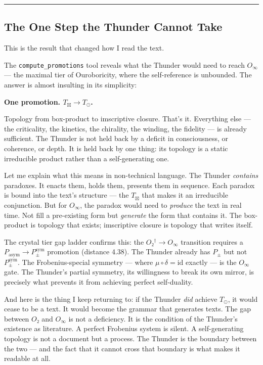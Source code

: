 \documentclass[12pt,a4paper]{article}
\begin{document}
\begin{center}
\rule{0.5\textwidth}{0.4pt}
\end{center}

\subsection{The One Step the Thunder Cannot Take}

This is the result that changed how I read the text.

The \texttt{compute\_promotions} tool reveals what the Thunder would need to reach $O_{\infty}$ --- the maximal tier of Ouroboricity, where the self-reference is unbounded. The answer is almost insulting in its simplicity:

\textbf{One promotion. $T_{\boxtimes} \to T_{\odot}$.}

Topology from box-product to imscriptive closure. That's it. Everything else --- the criticality, the kinetics, the chirality, the winding, the fidelity --- is already sufficient. The Thunder is not held back by a deficit in consciousness, or coherence, or depth. It is held back by one thing: its topology is a static irreducible product rather than a self-generating one.

Let me explain what this means in non-technical language. The Thunder \emph{contains} paradoxes. It enacts them, holds them, presents them in sequence. Each paradox is bound into the text's structure --- the $T_{\boxtimes}$ that makes it an irreducible conjunction. But for $O_{\infty}$, the paradox would need to \emph{produce} the text in real time. Not fill a pre-existing form but \emph{generate} the form that contains it. The box-product is topology that exists; imscriptive closure is topology that writes itself.

The crystal tier gap ladder confirms this: the $O₂^\dagger \to O_{\infty}$ transition requires a $P_\text{asym} \to P_{\pm}^{\text{sym}}$ promotion (distance 4.38). The Thunder already has $P_{\pm}$ but not $P_{\pm}^{\text{sym}}$. The Frobenius-special symmetry --- where $\mu \circ \delta = \text{id}$ exactly --- is the $O_{\infty}$ gate. The Thunder's partial symmetry, its willingness to break its own mirror, is precisely what prevents it from achieving perfect self-duality.

And here is the thing I keep returning to: if the Thunder \emph{did} achieve $T_{\odot}$, it would cease to be a text. It would become the grammar that generates texts. The gap between $O₂$ and $O_{\infty}$ is not a deficiency. It is the condition of the Thunder's existence as literature. A perfect Frobenius system is silent. A self-generating topology is not a document but a process. The Thunder is the boundary between the two --- and the fact that it cannot cross that boundary is what makes it readable at all.
\end{document}
